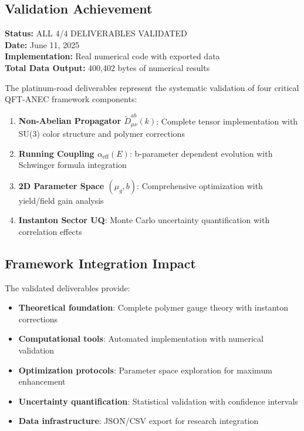 \documentclass[11pt]{article}
\begin{document}
\subsection{Validation Achievement}

\textbf{Status:} ALL 4/4 DELIVERABLES VALIDATED \\
\textbf{Date:} June 11, 2025 \\
\textbf{Implementation:} Real numerical code with exported data \\
\textbf{Total Data Output:} 400,402 bytes of numerical results

The platinum-road deliverables represent the systematic validation of four critical QFT-ANEC framework components:

\begin{enumerate}
\item \textbf{Non-Abelian Propagator $\tilde{D}^{ab}_{\mu\nu}(k)$}: Complete tensor implementation with SU(3) color structure and polymer corrections
\item \textbf{Running Coupling $\alpha_{\text{eff}}(E)$}: b-parameter dependent evolution with Schwinger formula integration  
\item \textbf{2D Parameter Space $(\mu_g, b)$}: Comprehensive optimization with yield/field gain analysis
\item \textbf{Instanton Sector UQ}: Monte Carlo uncertainty quantification with correlation effects
\end{enumerate}

\subsection{Framework Integration Impact}

The validated deliverables provide:
\begin{itemize}
\item \textbf{Theoretical foundation}: Complete polymer gauge theory with instanton corrections
\item \textbf{Computational tools}: Automated implementation with numerical validation
\item \textbf{Optimization protocols}: Parameter space exploration for maximum enhancement
\item \textbf{Uncertainty quantification}: Statistical validation with confidence intervals
\item \textbf{Data infrastructure}: JSON/CSV export for research integration
\end{itemize}
\end{document}
